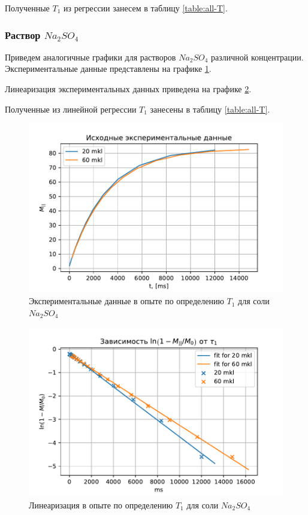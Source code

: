 Полученные $ T_1 $ из регрессии занесем в таблицу \ref{table:all-T}.

\newpage
\subsubsection{Раствор $Na_2 SO_4$}
Приведем аналогичные графики для растворов $ Na_2 SO_4 $ различной концентрации. Экспериментальные данные представлены на графике \ref{fig:nat1exp}.

Линеаризация экспериментальных данных приведена на графике \ref{fig:nat1reg}.

Полученные из линейной регрессии $ T_1 $ занесены в таблицу \ref{table:all-T}.
\newpage

\begin{figure}[h]
	\hspace{-1em}
	\includegraphics[width=1.0\linewidth]{data/Na_T_1_exp}
	\caption{Экспериментальные данные в опыте по определению $ T_1 $ для соли $ Na_2 SO_4 $}
	\label{fig:nat1exp}
	\vspace{-2em}
\end{figure}
\begin{figure}[H]
	\hspace{-1em}
	\includegraphics[width=1.0\linewidth]{data/Na_T_1_reg}
	\caption{Линеаризация в опыте по определению $ T_1 $ для соли $ Na_2 SO_4 $}
	\label{fig:nat1reg}
\end{figure}

